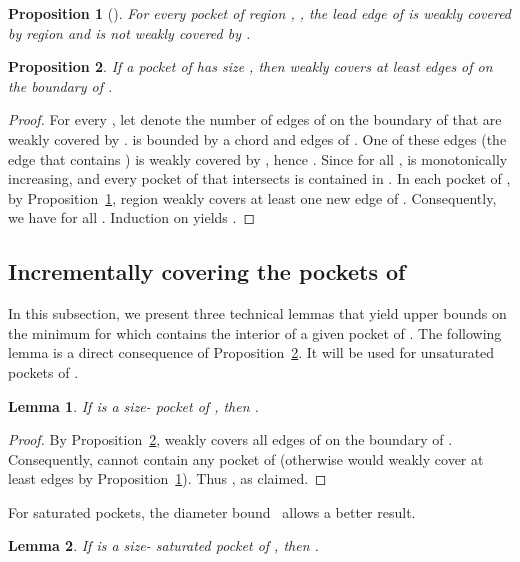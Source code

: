 \documentclass[12pt]{article}
\newtheorem{lemma}{Lemma}
\newtheorem{proposition}{Proposition}
\begin{document}
\begin{proposition}[\cite{Us}]\label{pp:Us}
For every pocket  of region , ,
the lead edge of  is weakly covered by region 
and \emph{is not} weakly covered by .
\end{proposition}

\begin{proposition}\label{pp:Us+}
If a pocket  of  has size , then 
weakly covers at least  edges of  on the boundary of .
\end{proposition}

\begin{proof}
  For every , let  denote the number of edges of  on the boundary of  that are weakly covered by .
 is bounded by a chord and  edges of .
One of these edges (the edge that contains ) is weakly covered by ,
  hence .
Since  for all ,
   is monotonically increasing, and every pocket of 
  that intersects  is contained in .
In each pocket of , by Proposition~\ref{pp:Us}, region  weakly covers at least one new edge of .
Consequently, we have  for all .
Induction on  yields .
\end{proof}

\subsection{Incrementally covering the pockets of }

In this subsection, we present three technical lemmas that yield upper
bounds on the minimum  for which  contains the interior of
a given pocket of .
The following lemma is a direct consequence of Proposition~\ref{pp:Us+}.
It will be used for unsaturated pockets of .

\begin{lemma}\label{lem:allpockets}
If  is a size- pocket of , then .
\end{lemma}

\begin{proof}
By Proposition~\ref{pp:Us+},  weakly covers all edges of  on the boundary of .
Consequently,  cannot contain any pocket of  (otherwise  would weakly
cover at least  edges by Proposition~\ref{pp:Us}).
Thus , as claimed.
\end{proof}

For saturated pockets, the diameter bound~\cite{Us} allows a better result.

\begin{lemma} \label{lem:saturated}
If  is a size- saturated pocket of ,
then .
\end{lemma}
\end{document}

